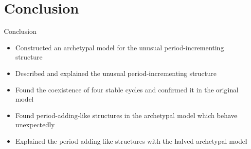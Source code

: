 \section{Conclusion}


\begin{frame}{Conclusion}
	\begin{itemize}
		\item Constructed an archetypal model for the unusual period-incrementing structure
		      \pause
		\item Described and explained the unusual period-incrementing structure
		      \pause
		\item Found the coexistence of four stable cycles and confirmed it in the original model
		      \pause
		\item Found period-adding-like structures in the archetypal model which behave unexpectedly
		      \pause
		\item Explained the period-adding-like structures with the halved archetypal model
	\end{itemize}
\end{frame}
